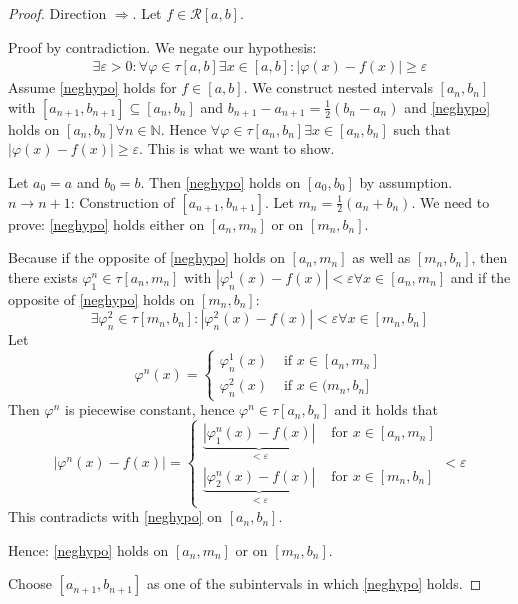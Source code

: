 \documentclass{article}
\newcommand{\card}[1]{\left|#1\right|}
\begin{document}
\begin{proof}
  Direction $\Rightarrow$. Let $f \in \mathcal R[a,b]$.

  Proof by contradiction. We negate our hypothesis:
  \begin{align}
    \exists \varepsilon > 0: \forall \varphi \in \tau[a,b] \exists x \in [a,b]: \card{\varphi(x) - f(x)} \geq \varepsilon
    \label{neghypo}
  \end{align}
  Assume \eqref{neghypo} holds for $f \in [a,b]$.
  We construct nested intervals $[a_n, b_n]$ with $[a_{n+1}, b_{n+1}] \subseteq [a_n, b_n]$
  and $b_{n+1} - a_{n+1} = \frac12 (b_n - a_n)$ and \eqref{neghypo} holds on $[a_n, b_n] \forall n \in \mathbb N$.
  Hence $\forall \varphi \in \tau[a_n, b_n] \exists x \in [a_n, b_n]$ such that $\card{\varphi(x) - f(x)} \geq \varepsilon$.
  This is what we want to show.

  Let $a_0 = a$ and $b_0 = b$. Then \eqref{neghypo} holds on $[a_0, b_0]$ by assumption.
  $n \to n+1$: Construction of $[a_{n+1}, b_{n+1}]$. Let $m_n = \frac12(a_n + b_n)$.
  We need to prove: \eqref{neghypo} holds either on $[a_n, m_n]$ or on $[m_n, b_n]$.

  Because if the opposite of \eqref{neghypo} holds on $[a_n, m_n]$ as well as $[m_n, b_n]$,
  then there exists $\varphi_1^n \in \tau[a_n, m_n]$ with $\card{\varphi_n^1(x) - f(x)} < \varepsilon \forall x \in [a_n, m_n]$
  and if the opposite of \eqref{neghypo} holds on $[m_n, b_n]$:
  \[ \exists \varphi_n^2 \in \tau[m_n, b_n]: \card{\varphi_n^2(x) - f(x)} < \varepsilon \forall x \in [m_n, b_n] \]
  Let
  \[
    \varphi^n(x) = \begin{cases}
      \varphi_n^1(x) & \text{ if } x \in [a_n, m_n] \\
      \varphi_n^2(x) & \text{ if } x \in (m_n, b_n]
    \end{cases}
  \]
  Then $\varphi^n$ is piecewise constant, hence $\varphi^n \in \tau[a_n, b_n]$ and it holds that
  \[
    \card{\varphi^n(x) - f(x)} = \begin{cases}
      \underbrace{\card{\varphi_1^n(x) - f(x)}}_{< \varepsilon}  & \text{ for } x \in [a_n, m_n] \\
      \underbrace{\card{\varphi_2^n(x) - f(x)}}_{< \varepsilon}  & \text{ for } x \in [m_n, b_n]
    \end{cases} < \varepsilon
  \]
  This contradicts with \eqref{neghypo} on $[a_n, b_n]$.

  Hence: \eqref{neghypo} holds on $[a_n, m_n]$ or on $[m_n, b_n]$.

  Choose $[a_{n+1}, b_{n+1}]$ as one of the subintervals in which \eqref{neghypo} holds.
\end{proof}
\end{document}
